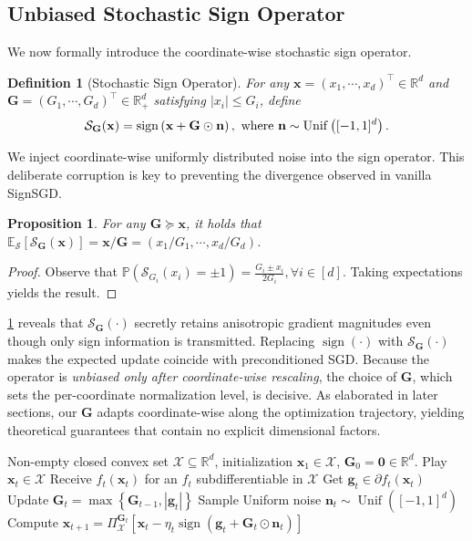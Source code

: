 \documentclass{article}
\newtheorem{prop}{Proposition}
\newtheorem{defn}{Definition}
\def \E {\mathbb{E}}
\def \x {\mathbf{x}}
\def \g {\mathbf{g}}
\def \R {\mathbb{R}}
\def \SS {\mathcal{S}}
\def \Gb {\mathbf{G}}
\def \n {\mathbf{n}}
\def \X {\mathcal{X}}
\DeclareMathOperator*{\sgn}{sign}
\DeclareMathOperator*{\unif}{Unif}
\newcommand{\abs}[1]{\left|#1\right|}
\newcommand{\sign}[1]{\sgn\left(#1\right)}
\def \Pr    {\mathbb{P}}
\newcommand{\sqbrac}[1]{\left[#1\right]}
\newcommand{\brac}[1]{\left(#1\right)}
\newcommand{\cbrac}[1]{\left\{#1\right\}}
\def\0{\bm{0}}
\begin{document}
\subsection{Unbiased Stochastic Sign Operator}

We now formally introduce the coordinate-wise stochastic sign operator.
\begin{defn}[Stochastic Sign Operator]\label{def:stochastic-sign}
    For any $\x=(x_1,\cdots,x_d)^\top\in\R^d$ and $\Gb=(G_1,\cdots,\allowbreak G_d)^\top\in\R^d_+$ satisfying $\abs{x_i}\le G_i$, define
    \begin{align*}
        \SS_\Gb(\x)=\sgn\brac{\x+\Gb\odot\n},\textnormal{ where }\n\sim\unif\brac{[-1,1]^d}.
    \end{align*}
\end{defn}

We inject coordinate-wise uniformly distributed noise into the sign operator. This deliberate corruption is key to preventing the divergence observed in vanilla SignSGD.

\begin{prop}\label{prop:unbiased-sign}
    For any $\Gb\succeq\x$, it holds that $\E_\SS\sqbrac{\SS_\Gb(\x)}=\x/\Gb=(x_1/G_1,\cdots,x_d/G_d)$.
\end{prop}

\begin{proof}
    Observe that $\Pr\brac{\SS_{G_i}(x_i)=\pm1}=\frac{G_i\pm x_i}{2G_i},\forall i\in[d]$. Taking expectations yields the result.
\end{proof}

\cref{prop:unbiased-sign} reveals that $\SS_\Gb(\cdot)$ secretly retains anisotropic gradient magnitudes even though only sign information is transmitted. Replacing $\sgn(\cdot)$ with $\SS_\Gb(\cdot)$ makes the expected update coincide with preconditioned SGD. Because the operator is \emph{unbiased only after coordinate-wise rescaling}, the choice of $\Gb$, which sets the per-coordinate normalization level, is decisive. As elaborated in later sections, our $\Gb$ adapts coordinate-wise along the optimization trajectory, yielding theoretical guarantees that contain no explicit dimensional factors.


\begin{algorithm}[t]
  \caption{Online Stochastic Sign (Sub)Gradient Descent}
  \label{alg:online-stosignsgd}
  \begin{algorithmic}[1]
     Non-empty closed convex set $\X\subseteq\R^d$, initialization $\x_1\in\X$, $\Gb_0=\0\in\R^d$.
    \STATE Play $\x_t\in\X$
    \STATE Receive $f_t(\x_t)$ for an $f_t$ subdifferentiable in $\X$
    \STATE Get $\g_t\in\partial f_t(\x_t)$
    \STATE Update $\Gb_t=\max\cbrac{\Gb_{t-1},\abs{\g_t}}$
    \STATE Sample Uniform noise $\n_t\sim\unif\brac{[-1,1]^d}$
    \STATE Compute $\x_{t+1}=\Pi_\X^{\Gb_t}\sqbrac{\x_{t}-\eta_t\sign{\g_t+\Gb_t\odot\n_t}}$
    \ENDFOR
  \end{algorithmic}
\end{algorithm}
\end{document}
